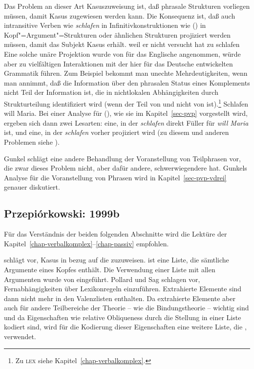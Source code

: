 \noindent
Das Problem an dieser Art Kasuszuweisung ist, daß phrasale Strukturen vorliegen müssen,
damit Kasus zugewiesen werden kann. Die Konsequenz ist, daß auch intransitive Verben wie \emph{schlafen}
in Infinitivkonstruktionen wie () in Kopf"=Argument"=Strukturen oder ähnlichen Strukturen
projiziert werden müssen, damit das Subjekt Kasus erhält.
\ea
weil er nicht versucht hat zu schlafen
\z
Eine solche unäre Projektion wurde von \citet*[, Fn. 32]{ps2} für das Englische
angenommen, würde aber zu vielfältigen Interaktionen mit der hier für das Deutsche
entwickelten Grammatik führen. Zum Beispiel bekommt man unechte Mehrdeutigkeiten,
wenn man annimmt, daß die Information über den phrasalen Status eines Komplements 
nicht Teil der Information ist, die in nichtlokalen Abhängigkeiten durch Strukturteilung
identifiziert wird (wenn der \lexw{} Teil von \synsem und nicht von \HPSGloc ist).\footnote{
  Zu \textsc{lex} siehe Kapitel~\ref{chap-verbalkomplex}.%
}
\ea
Schlafen will Maria.
\z
Bei einer Analyse für (), wie sie im Kapitel~\ref{sec-pvp} vorgestellt wird, ergeben
sich dann zwei Lesarten: eine, in der {\em schlafen\/} direkt Füller für {\em will Maria\/}
ist, und eine, in der {\em schlafen\/} vorher projiziert wird (zu diesem und anderen Problemen siehe
).

Gunkel schlägt eine andere Behandlung der Voranstellung von Teilphrasen vor, die
zwar dieses Problem nicht, aber dafür andere, schwerwiegendere hat. Gunkels Analyse
für die Voranstellung von Phrasen wird in Kapitel~\ref{sec-pvp-vdrei} genauer diskutiert.






\subsection{Przepi{\'o}rkowski: 1999b}
\label{kasus-adamp}

Für das Verständnis der beiden folgenden Abschnitte wird die Lektüre
der Kapitel~\ref{chap-verbalkomplex}--\ref{chap-passiv} empfohlen.

\citet{Prze99} schlägt vor, Kasus in bezug auf die \argstl zuzuweisen. \argst{} ist eine
Liste, die sämtliche Argumente eines Kopfes enthält. Die Verwendung einer
Liste mit allen Argumenten wurde von \citet[Kapitel~9]{ps2} eingeführt. Pollard
und Sag schlagen vor, Fernabhängigkeiten über Lexikonregeln einzuführen.
Extrahierte Elemente sind dann nicht mehr in den Valenzlisten enthalten.
Da extrahierte Elemente aber auch für andere Teilbereiche der Theorie -- wie \zb
die Bindungstheorie -- wichtig sind und da Eigenschaften wie
relative Obliqueness durch die Stellung in einer Liste kodiert sind, wird für die
Kodierung dieser Eigenschaften eine weitere Liste, die \argstl, verwendet.

